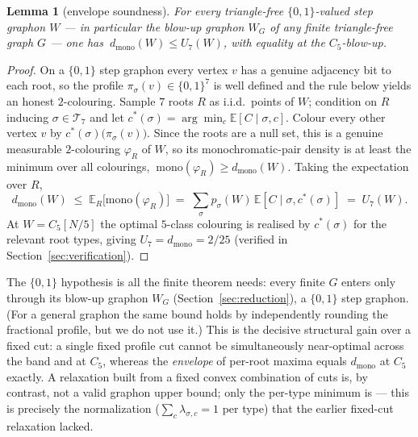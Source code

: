 \documentclass[11pt]{article}
\newtheorem{lemma}[theorem]{Lemma}
\theoremstyle{remark}
\newcommand{\dmono}{d_{\mathrm{mono}}}
\begin{document}
\begin{lemma}[envelope soundness]\label{lem:env}
For every triangle-free $\{0,1\}$-valued step graphon $W$ --- in particular the
blow-up graphon $W_G$ of any finite triangle-free graph $G$ --- one has
$\ \dmono(W)\le U_7(W)$, with equality at the $C_5$-blow-up.
\end{lemma}

\begin{proof}
On a $\{0,1\}$ step graphon every vertex $v$ has a genuine adjacency bit to each
root, so the profile $\pi_\sigma(v)\in\{0,1\}^7$ is well defined and the rule below
yields an honest $2$-colouring. Sample $7$ roots $R$ as i.i.d.\ points of $W$;
condition on $R$ inducing
$\sigma\in\mathcal{T}_7$ and let $c^\ast(\sigma)=\arg\min_c\mathbb{E}[C\mid\sigma,c]$.
Colour every other vertex $v$ by $c^\ast(\sigma)\bigl(\pi_\sigma(v)\bigr)$. Since the
roots are a null set, this is a genuine measurable $2$-colouring $\varphi_R$ of $W$,
so its monochromatic-pair density is at least the minimum over all colourings,
$\ \mathrm{mono}(\varphi_R)\ge \dmono(W)$. Taking the expectation over $R$,
\[
  \dmono(W)\;\le\;\mathbb{E}_R\bigl[\mathrm{mono}(\varphi_R)\bigr]
        \;=\;\sum_{\sigma}p_\sigma(W)\,\mathbb{E}[C\mid\sigma,c^\ast(\sigma)]
        \;=\;U_7(W).
\]
At $W=C_5[N/5]$ the optimal $5$-class colouring is realised by $c^\ast(\sigma)$ for
the relevant root types, giving $U_7=\dmono=2/25$ (verified in
Section~\ref{sec:verification}).
\end{proof}

The $\{0,1\}$ hypothesis is all the finite theorem needs: every finite $G$ enters
only through its blow-up graphon $W_G$ (Section~\ref{sec:reduction}), a $\{0,1\}$
step graphon. (For a general graphon the same bound holds by independently rounding
the fractional profile, but we do not use it.) This is the decisive structural gain
over a fixed cut: a single fixed profile cut cannot be simultaneously near-optimal
across the band and at $C_5$, whereas the \emph{envelope} of per-root maxima equals
$\dmono$ at $C_5$ exactly. A relaxation built from a fixed convex combination of
cuts is, by contrast, not a valid graphon upper bound; only the per-type minimum
is --- this is precisely the normalization ($\sum_c\lambda_{\sigma,c}=1$ per type)
that the earlier fixed-cut relaxation lacked.
\end{document}
